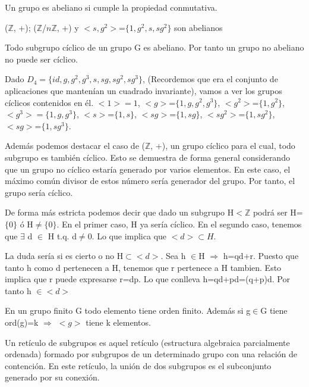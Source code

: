 \documentclass[a4paper,10pt]{apuntes}
\begin{document}
  \begin{defn}
   Un grupo es abeliano si cumple la propiedad conmutativa.
  \end{defn}

  \begin{example}
   ($\mathds{Z}$, +); ($\mathds{Z}$/$n\mathds{Z}$, +) y $<s,g^{2}>$=$\{1,g^{2},s,sg^{2}\}$ son abelianos
  \end{example}
  
  \begin{lemma}
   Todo subgrupo cíclico de un grupo G es abeliano. Por tanto un grupo no abeliano no puede ser cíclico.
  \end{lemma}
  
  \begin{example}
   Dado $D_{4}=\{id, g, g^{2}, g^{3}, s, sg, sg^{2},sg^{3}\}$, (Recordemos que era el conjunto de aplicaciones que mantenían un
   cuadrado invariante), vamos a ver los grupos cíclicos contenidos en él.
   $<1>={1}$, $<g>$=$\{1,g,g^{2}, g^{3}\}$, $<g^{2}>$=$\{1,g^{2}\}$, $<g^{3}>=\{1,g, g^{3}\}$, $<s>$=$\{1,s\}$, $<sg>$=$\{1, sg\}$, $<sg^{2}>$=$\{1, sg^{2}\}$, $<sg>$=$\{1, sg^{3}\}$.
   
   Además podemos destacar el caso de ($\mathds{Z}$, +), un grupo cíclico para el cual, todo subgrupo es también cíclico. Esto se demuestra
   de forma general considerando que un grupo no cíclico estaría generado por varios elementos. En este caso, el máximo común
   divisor de estos número sería generador del grupo. Por tanto, el grupo sería cíclico.
 
   De forma más estricta podemos decir que dado un subgrupo H$<\mathds{Z}$ podrá ser H=$\{0\}$ ó H$\neq\{0\}$. 
   En el primer caso, H ya sería cíclico. En el segundo caso, tenemos que $\exists$  d $\in$  H t.q. d$\neq$0. Lo que implica
   que $<d>\subset H$. 
   
   La duda sería si es cierto o no H$\subset <d>$. Sea h $\in$H  $\Rightarrow$  h=qd+r. Puesto que tanto h como d pertenecen a H,
   tenemos que r pertenece a H tambien. Esto implica que r puede expresarse r=dp. Lo que conlleva h=qd+pd=(q+p)d. Por tanto h $\in <d>$
  \end{example}
  \begin{theorem}
   En un grupo finito G todo elemento tiene orden finito. Además si g$\in$G tiene ord(g)=k $\Rightarrow$  $<g>$  tiene k elementos.
  \end{theorem}

  \begin{defn}
   Un retículo de subgrupos es aquel retículo (estructura algebraica parcialmente ordenada) formado por subgrupos de un determinado grupo
   con una relación de contención. En este retículo, la unión de dos subgrupos es el subconjunto generado por su conexión.
  \end{defn}
\end{document}
